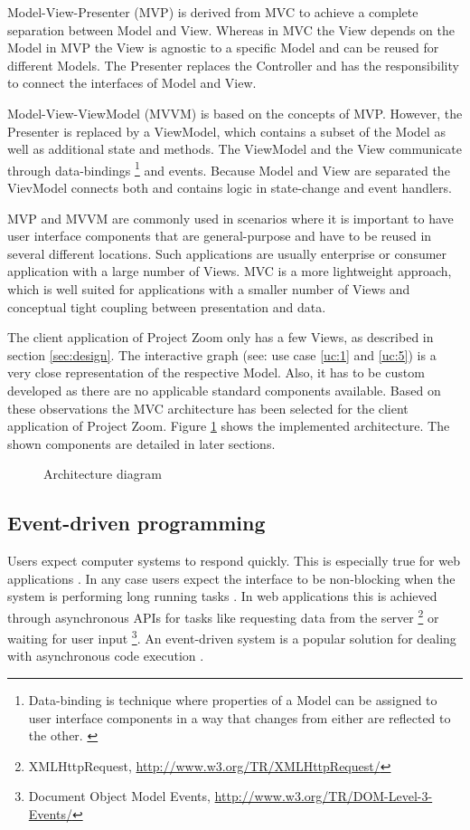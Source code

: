 Model-View-Presenter (MVP) is derived from MVC to achieve a complete separation between Model and View. Whereas in MVC the View depends on the Model in MVP the View is agnostic to a specific Model and can be reused for different Models. The Presenter replaces the Controller and has the responsibility to connect the interfaces of Model and View. 

Model-View-ViewModel (MVVM) is based on the concepts of MVP. However, the Presenter is replaced by a ViewModel, which contains a subset of the Model as well as additional state and methods. The ViewModel and the View communicate through data-bindings \footnote{Data-binding is technique where properties of a Model can be assigned to user interface components in a way that changes from either are reflected to the other. \cite{Bent_2004}} and events. Because Model and View are separated the VievModel connects both and contains logic in state-change and event handlers.

MVP and MVVM are commonly used in scenarios where it is important to have user interface components that are general-purpose and have to be reused in several different locations. Such applications are usually enterprise or consumer application with a large number of Views. MVC is a more lightweight approach, which is well suited for applications with a smaller number of Views and conceptual tight coupling between presentation and data. \cite{Osmani_2012}

The client application of Project Zoom only has a few Views, as described in section \ref{sec:design}. The interactive graph (see: use case \ref{uc:1} and \ref{uc:5}) is a very close representation of the respective Model. Also, it has to be custom developed as there are no applicable standard components available. Based on these observations the MVC architecture has been selected for the client application of Project Zoom. Figure \ref{fig:arch} shows the implemented architecture. The shown components are detailed in later sections.

\begin{figure}
\caption{Architecture diagram}
\label{fig:arch}
\end{figure}

\subsection{Event-driven programming}

Users expect computer systems to respond quickly. This is especially true for web applications \cite{Selvidge_1999}. In any case users expect the interface to be non-blocking when the system is performing long running tasks \cite{Nielsen_1994}.  In web applications this is achieved through asynchronous APIs for tasks like requesting data from the server \footnote{XMLHttpRequest, \url{http://www.w3.org/TR/XMLHttpRequest/}} or waiting for user input \footnote{Document Object Model Events, \url{http://www.w3.org/TR/DOM-Level-3-Events/}}. An event-driven system is a popular solution for dealing with asynchronous code execution \cite{Michelson_2006}. 

